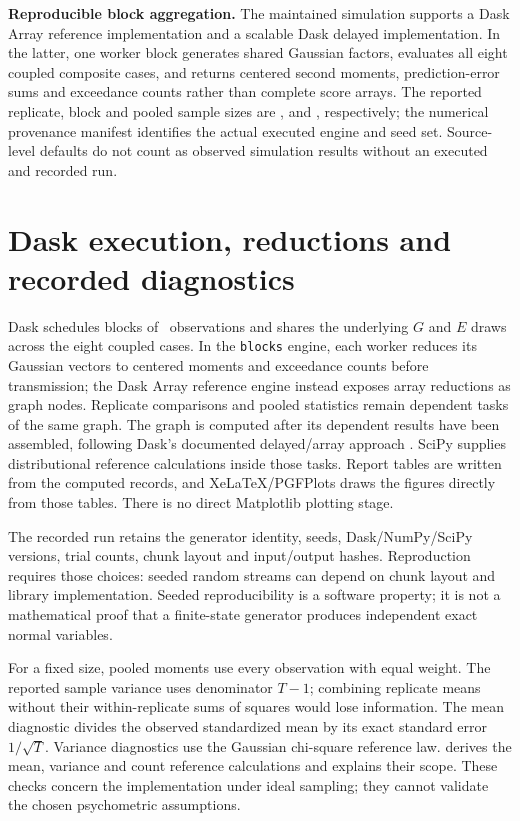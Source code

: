 \noindent\textbf{Reproducible block aggregation.}
The maintained simulation supports a Dask Array reference implementation
and a scalable Dask delayed implementation. In the latter, one worker
block generates shared Gaussian factors, evaluates all eight coupled
composite cases, and returns centered second moments, prediction-error
sums and exceedance counts rather than complete score arrays. The
reported replicate, block and pooled sample sizes are
\SimReplicates{}, \SimChunk{} and \SimPooledTrials{}, respectively;
the numerical provenance manifest identifies the actual executed
engine and seed set. Source-level defaults do not count as observed
simulation results without an executed and recorded run.

\chapter{Dask execution, reductions and recorded diagnostics}
Dask schedules blocks of \SimChunk\ observations and shares the
underlying \(G\) and \(E\) draws across the eight coupled cases.
In the \texttt{blocks} engine, each worker reduces its Gaussian
vectors to centered moments and exceedance counts before transmission;
the Dask Array reference engine instead exposes array reductions as
graph nodes. Replicate comparisons and pooled statistics remain
dependent tasks of the same graph. The graph is computed after its dependent results have
been assembled, following Dask's documented delayed/array approach
\citep{daskdocs,daskArray,daskDelayed}. SciPy supplies distributional
reference calculations inside those tasks. Report tables are written from
the computed records, and XeLaTeX/PGFPlots draws the figures directly from
those tables. There is no direct Matplotlib plotting stage.

The recorded run retains the generator identity, seeds, Dask/NumPy/SciPy
versions, trial counts, chunk layout and input/output hashes. Reproduction
requires those choices: seeded random streams can depend on chunk layout
and library implementation. Seeded reproducibility is a software property;
it is not a mathematical proof that a finite-state generator produces
independent exact normal variables.

For a fixed size, pooled moments use every observation with equal weight.
The reported sample variance uses denominator \(T-1\); combining replicate
means without their within-replicate sums of squares would lose information.
The mean diagnostic divides the observed standardized mean by its exact
standard error \(1/\sqrt T\). Variance diagnostics use the Gaussian
chi-square reference law. 
derives the mean, variance and count reference calculations and explains
their scope. These checks concern the implementation under ideal sampling;
they cannot validate the chosen psychometric assumptions.


